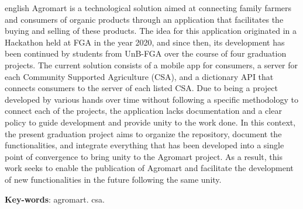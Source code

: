 \begin{resumo}[Abstract]
 \begin{otherlanguage*}{english}
   Agromart is a technological solution aimed at connecting family farmers and consumers of organic products through an application that facilitates the buying and selling of these products. The idea for this application originated in a Hackathon held at FGA in the year 2020, and since then, its development has been continued by students from UnB-FGA over the course of four graduation projects. The current solution consists of a mobile app for consumers, a server for each Community Supported Agriculture (CSA), and a dictionary API that connects consumers to the server of each listed CSA. Due to being a project developed by various hands over time without following a specific methodology to connect each of the projects, the application lacks documentation and a clear policy to guide development and provide unity to the work done. In this context, the present graduation project aims to organize the repository, document the functionalities, and integrate everything that has been developed into a single point of convergence to bring unity to the Agromart project. As a result, this work seeks to enable the publication of Agromart and facilitate the development of new functionalities in the future following the same unity.

   \vspace{\onelineskip}
 
   \noindent 
   \textbf{Key-words}: agromart. csa.
 \end{otherlanguage*}
\end{resumo}
